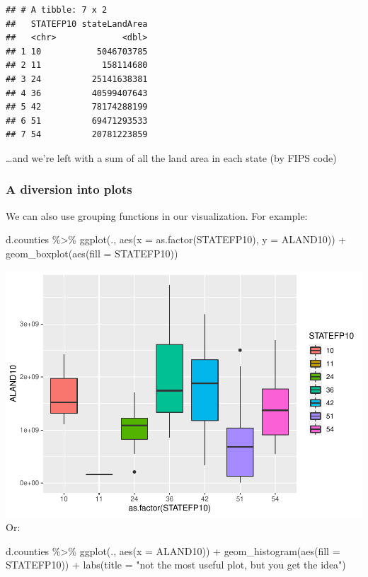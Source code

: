 \documentclass[]{article}
\newenvironment{Shaded}{\begin{snugshade}}{\end{snugshade}}
\newcommand{\AttributeTok}[1]{\textcolor[rgb]{0.77,0.63,0.00}{#1}}
\newcommand{\FunctionTok}[1]{\textcolor[rgb]{0.00,0.00,0.00}{#1}}
\newcommand{\NormalTok}[1]{#1}
\newcommand{\SpecialCharTok}[1]{\textcolor[rgb]{0.00,0.00,0.00}{#1}}
\newcommand{\StringTok}[1]{\textcolor[rgb]{0.31,0.60,0.02}{#1}}
\begin{document}
\begin{verbatim}
## # A tibble: 7 x 2
##   STATEFP10 stateLandArea
##   <chr>             <dbl>
## 1 10           5046703785
## 2 11            158114680
## 3 24          25141638381
## 4 36          40599407643
## 5 42          78174288199
## 6 51          69471293533
## 7 54          20781223859
\end{verbatim}

\ldots and we're left with a sum of all the land area in each state (by
FIPS code)

\hypertarget{a-diversion-into-plots}{%
\subsubsection{A diversion into plots}\label{a-diversion-into-plots}}

We can also use grouping functions in our visualization. For example:

\begin{Shaded}
\begin{Highlighting}[]
\NormalTok{d.counties }\SpecialCharTok{\%\textgreater{}\%} 
  \FunctionTok{ggplot}\NormalTok{(., }\FunctionTok{aes}\NormalTok{(}\AttributeTok{x =} \FunctionTok{as.factor}\NormalTok{(STATEFP10), }\AttributeTok{y =}\NormalTok{ ALAND10)) }\SpecialCharTok{+}
  \FunctionTok{geom\_boxplot}\NormalTok{(}\FunctionTok{aes}\NormalTok{(}\AttributeTok{fill =}\NormalTok{ STATEFP10))}
\end{Highlighting}
\end{Shaded}

\includegraphics{lab01_files/figure-latex/plots-1.pdf} Or:

\begin{Shaded}
\begin{Highlighting}[]
\NormalTok{d.counties }\SpecialCharTok{\%\textgreater{}\%} 
  \FunctionTok{ggplot}\NormalTok{(., }\FunctionTok{aes}\NormalTok{(}\AttributeTok{x =}\NormalTok{ ALAND10)) }\SpecialCharTok{+}
  \FunctionTok{geom\_histogram}\NormalTok{(}\FunctionTok{aes}\NormalTok{(}\AttributeTok{fill =}\NormalTok{ STATEFP10)) }\SpecialCharTok{+}
  \FunctionTok{labs}\NormalTok{(}\AttributeTok{title =} \StringTok{"not the most useful plot, but you get the idea"}\NormalTok{)}
\end{Highlighting}
\end{Shaded}
\end{document}
